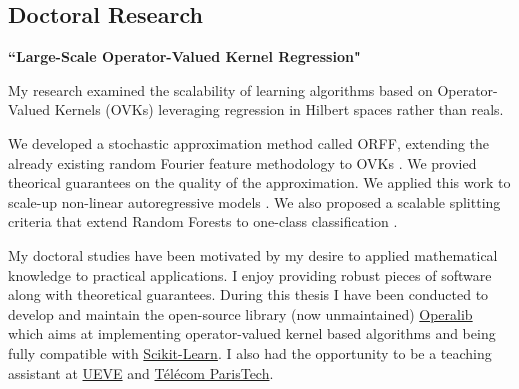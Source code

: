 \documentclass[10pt]{article} %
\begin{document}
\begin{paracol}{2}
\section{Doctoral Research}
%
{\raggedright\textbf{``Large-Scale Operator-Valued Kernel
                       Regression"} \citep{braul2017}\\\medskip}
%
My research examined the scalability of learning algorithms based on
Operator-Valued Kernels (OVKs) leveraging regression in Hilbert spaces rather
than reals. \par
\hspace*{5pt} We developed a stochastic approximation method called ORFF,
extending the already existing random Fourier feature methodology to OVKs
\citep{pmlr-v63-Brault39}. We provied theorical guarantees on the quality of
the approximation. We applied this work to scale-up non-linear autoregressive
models \citep{brault2016scaling}. We also proposed a scalable splitting
criteria that extend Random Forests to one-class classification
\citep{pmlr-v77-goix17a}. \par
\hspace*{5pt}
My doctoral studies have been motivated by my desire to applied mathematical
knowledge to practical applications. I enjoy providing robust pieces of
software along with theoretical guarantees. During this thesis I have been
conducted to develop and maintain the open-source library (now unmaintained)
\href{https://github.com/operalib/operalib}{Operalib} which aims at
implementing operator-valued kernel based algorithms and being fully
compatible with
\href{http://scikit-learn.org/stable/index.html}{Scikit-Learn}. I also had the
opportunity to be a teaching assistant at
\href{https://www.univ-evry.fr/accueil.html}{UEVE} and
\href{https://www.telecom-paristech.fr/}{T\'el\'ecom ParisTech}.
%
\medskip %
%
%

\end{paracol}
\end{document}
